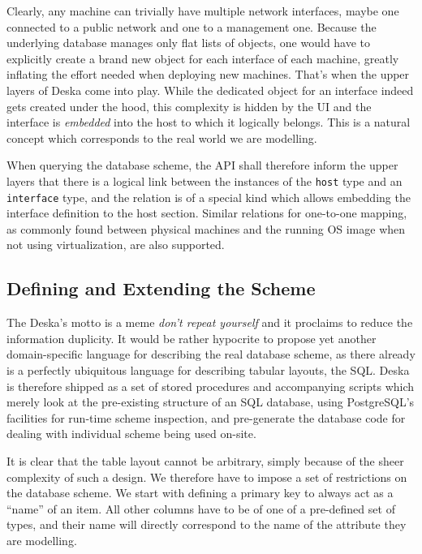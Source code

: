 \documentclass[a4paper]{jpconf}
\begin{document}
Clearly, any machine can trivially have multiple network interfaces, maybe one connected to a public network and one to a management
one.  Because the underlying database manages only flat lists of objects, one would have to explicitly create a brand new object for
each interface of each machine, greatly inflating the effort needed when deploying new machines.  That's when the upper layers of Deska
come into play.  While the dedicated object for an interface indeed gets created under the hood, this complexity is hidden by the UI and the interface
is {\em embedded} into the host to which it logically belongs.  This is a natural concept which corresponds to the real world we are
modelling.

When querying the database scheme, the API shall therefore inform the upper layers that there is a logical link between the instances
of the {\tt host} type and an {\tt interface} type, and the relation is of a special kind which allows embedding the interface
definition to the host section.  Similar relations for one-to-one mapping, as commonly found between physical machines and the running
OS image when not using virtualization, are also supported.

\subsection{Defining and Extending the Scheme}

The Deska's motto is a meme {\em don't repeat yourself} and it proclaims to reduce the information duplicity.  It would be rather
hypocrite to propose yet another domain-specific language for describing the real database scheme, as there already is a perfectly
ubiquitous language for describing tabular layouts, the SQL.  Deska is therefore shipped as a set of stored procedures and accompanying
scripts which merely look at the pre-existing structure of an SQL database, using PostgreSQL's facilities for run-time scheme inspection,
and pre-generate the database code for dealing with individual scheme being used on-site.

It is clear that the table layout cannot be arbitrary, simply because of the sheer complexity of such a design.  We therefore have to
impose a set of restrictions on the database scheme.  We start with defining a primary key to always act as a ``name'' of an item.  All
other columns have to be of one of a pre-defined set of types, and their name will directly correspond to the name of the attribute
they are modelling.
\end{document}
